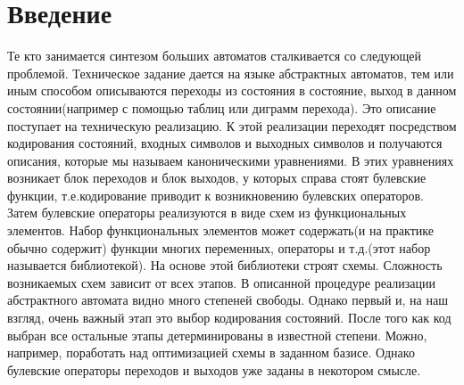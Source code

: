\chapter*{Введение}
\par Те кто занимается синтезом больших автоматов сталкивается со следующей проблемой. Техническое задание дается на языке абстрактных автоматов, тем или иным способом описываются переходы из состояния в состояние, выход в данном состоянии(например с помощью таблиц или диграмм перехода). Это описание поступает на техническую реализацию. К этой реализации переходят посредством кодирования состояний, входных символов и выходных символов и получаются описания, которые мы называем каноническими уравнениями. В этих уравнениях возникает блок переходов и блок выходов, у которых справа стоят булевские функции, т.е.кодирование приводит к возникновению булевских операторов. Затем булевские операторы реализуются в виде схем из функциональных элементов. Набор функциональных элементов может содержать(и на практике обычно содержит) функции многих переменных, операторы и т.д.(этот набор называется библиотекой). На основе этой библиотеки строят схемы. Сложность возникаемых схем зависит от всех этапов. 
В описанной процедуре реализации абстрактного автомата видно много степеней свободы. Однако первый и, на наш взгляд, очень важный этап это выбор кодирования состояний. После того как код выбран все остальные этапы детерминированы в известной степени. Можно, например, поработать над оптимизацией схемы в заданном базисе. Однако булевские операторы переходов и выходов уже заданы в некотором смысле.
%

